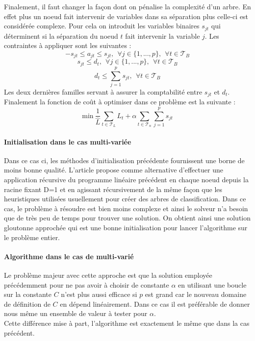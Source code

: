 \documentclass[12pt]{report}
\begin{document}
Finalement, il faut changer la façon dont on pénalise la complexité d'un arbre. En effet plus un noeud fait intervenir de variables dans sa séparation plus celle-ci est considérée complexe. Pour cela on introduit les variables binaires \(s_{jt}\) qui déterminent si la séparation du noeud \(t\) fait intervenir la variable \(j\). Les contraintes à appliquer sont les suivantes :
\[
-s_{jt} \leq a_{jt}  \leq s_{jt}, ~~ \forall j \in \{1,...,p\},~~\forall t \in \mathcal{T}_B
\]
\[
s_{jt} \leq d_{t},  ~~ \forall j \in \{1,...,p\},~~\forall t \in \mathcal{T}_B
\]
\[
d_t \leq \sum_{j=1}^p s_{jt},~~ \forall  t \in \mathcal{T}_B
\]
Les deux dernières familles servant à assurer la comptabilité entre \(s_{jt}\) et \(d_{t}\).\\
Finalement la fonction de coût à optimiser dans ce problème est la suivante :
\[
\mbox{min} ~ \frac{1}{\hat{L}}\sum_{t\in \mathcal{T}_L}L_t + \alpha \sum_{t\in \mathcal{T}_n} \sum_{j=1}^p s_{jt}
\]

\paragraph{Initialisation dans le cas multi-variée} Dans ce cas ci, les méthodes d'initialisation précédente fournissent une borne de moins bonne qualité. L'article propose comme alternative d'effectuer une application récursive du programme linéaire précédent en chaque noeud depuis la racine fixant D=1 et en agissant récursivement de la même façon que les heuristiques utilisées usuellement pour créer des arbres de classification. Dans ce cas, le problème à résoudre est bien moins complexe et ainsi le solveur n'a besoin que de très peu de temps pour trouver une solution. On obtient ainsi une solution gloutonne approchée qui est une bonne initialisation pour lancer l'algorithme sur le problème entier.

\paragraph{Algorithme dans le cas de multi-varié} Le problème majeur avec cette approche est que la solution employée précédemment pour ne pas avoir à choisir de constante \(\alpha\) en utilisant une boucle sur la constante \(C\) n'est plus aussi efficace si \(p\) est grand car le nouveau domaine de définition de \(C\) en dépend linéairement. Dans ce cas il est préférable de donner nous même un ensemble de valeur à tester pour \(\alpha\).\\
Cette différence mise à part, l'algorithme est exactement le même que dans la cas précédent.
\end{document}
